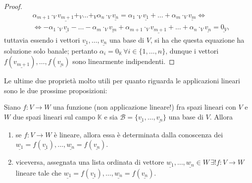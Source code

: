\begin{proof}
\begin{align}
    &\alpha_{m+1} \cdot_V \underline{v_{m+1}} +_V \ldots +_V \alpha_n \cdot_V \underline{v_n} = \alpha_1 \cdot_V \underline{v_1} + \ldots + \alpha_m \cdot_V \underline{v_m} \iff \\ &\iff -\alpha_1 \cdot_V \underline{v_1} - \ldots - \alpha_m \cdot_V \underline{v_m} + \alpha_{m+1} \cdot_V \underline{v_{m+1}} + \ldots + \alpha_n \cdot_V \underline{v_n} = \underline{0_V},
  \end{align}
  tuttavia essendo i vettori $\underline{v_1}, \ldots, \underline{v_n}$ una base di $V$, si ha che questa equazione ha soluzione solo banale; pertanto $\alpha_i = 0_\mathbb{K} \, \forall i \in \{ 1, \ldots, n \}$, dunque i vettori $f(\underline{v_{m+1}}), \ldots, f(\underline{v_{n}})$ sono linearmente indipendenti.
\end{proof}
Le ultime due proprietà molto utili per quanto riguarda le applicazioni lineari sono le due prossime proposizioni:
\begin{prop}
  Siano $f: V \to W$ una funzione (non applicazione lineare!) fra spazi lineari con $V$ e $W$ due spazi lineari sul campo $\mathbb{K}$ e sia $\mathcal{B} = \{ \underline{v_1}, \ldots, \underline{v_n} \}$ una base di $V$. Allora
  \begin{enumerate}[label=\protect\circled{\arabic*}]
    \item se $f: V \to W$ è lineare, allora essa è determinata dalla conoscenza dei $\underline{w_1} = f(\underline{v_1}), \ldots, \underline{w_n} = f(\underline{v_n})$.
    \item viceversa, assegnata una lista ordinata di vettore $\underline{w_1}, \ldots, \underline{w_n} \in W \, \exists ! f: V \to W$ lineare tale che $\underline{w_1} = f(\underline{v_1}), \ldots, \underline{w_n} = f(\underline{v_n})$.  
  \end{enumerate}
\end{prop}
